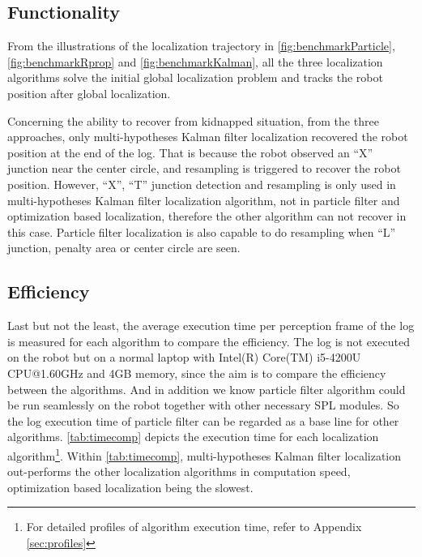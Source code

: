 \subsection{Functionality}
\label{sub:Functionality}

From the illustrations of the localization trajectory in \autoref{fig:benchmarkParticle}, \autoref{fig:benchmarkRprop} and \autoref{fig:benchmarkKalman}, all the three localization algorithms solve the initial global localization problem and tracks the robot position after global localization. 

Concerning the ability to recover from kidnapped situation, from the three approaches, only multi-hypotheses Kalman filter localization recovered the robot position at the end of the log. That is because the robot observed an ``X'' junction near the center circle, and resampling is triggered to recover the robot position. However, ``X'', ``T'' junction detection and resampling is only used in multi-hypotheses Kalman filter localization algorithm, not in particle filter and optimization based localization, therefore the other algorithm can not recover in this case. Particle filter localization is also capable to do resampling when ``L'' junction, penalty area or center circle are seen.

\subsection{Efficiency}
\label{sub:Efficiency}
Last but not the least, the average execution time per perception frame of the log is measured for each algorithm to compare the efficiency. The log is not executed on the robot but on a normal laptop with Intel(R) Core(TM) i5-4200U CPU@1.60GHz and 4GB memory, since the aim is to compare the efficiency between the algorithms. And in addition we know particle filter algorithm could be run seamlessly on the robot together with other necessary \gls{SPL} modules. So the log execution time of particle filter can be regarded as a base line for other algorithms. \autoref{tab:timecomp} depicts the execution time for each localization algorithm\footnote{For detailed profiles of algorithm execution time, refer to Appendix \ref{sec:profiles}}. Within \autoref{tab:timecomp}, multi-hypotheses Kalman filter localization out-performs the other localization algorithms in computation speed, optimization based localization being the slowest.




